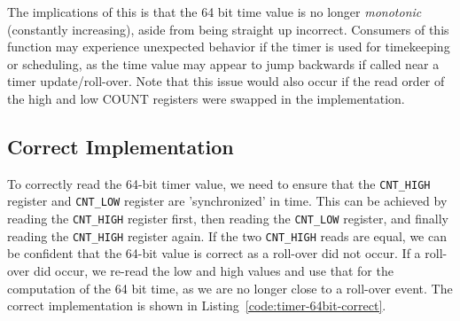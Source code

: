 \documentclass[main.tex]{subfiles}
\begin{document}
\noindent The implications of this is that the 64 bit time value is no longer \textit{monotonic} (constantly increasing), aside from being straight up incorrect. Consumers of this function may experience unexpected behavior if the timer is used for timekeeping or scheduling, as the time value may appear to jump backwards if called near a timer update/roll-over. Note that this issue would also occur if the read order of the high and low COUNT registers were swapped in the implementation.

\subsection{Correct Implementation}
To correctly read the 64-bit timer value, we need to ensure that the \texttt{CNT\_HIGH} register and \texttt{CNT\_LOW} register are 'synchronized' in time. This can be achieved by reading the \texttt{CNT\_HIGH} register first, then reading the \texttt{CNT\_LOW} register, and finally reading the \texttt{CNT\_HIGH} register again. If the two \texttt{CNT\_HIGH} reads are equal, we can be confident that the 64-bit value is correct as a roll-over did not occur. If a roll-over did occur, we re-read the low and high values and use that for the computation of the 64 bit time, as we are no longer close to a roll-over event. The correct implementation is shown in Listing~\ref{code:timer-64bit-correct}.


\end{document}

